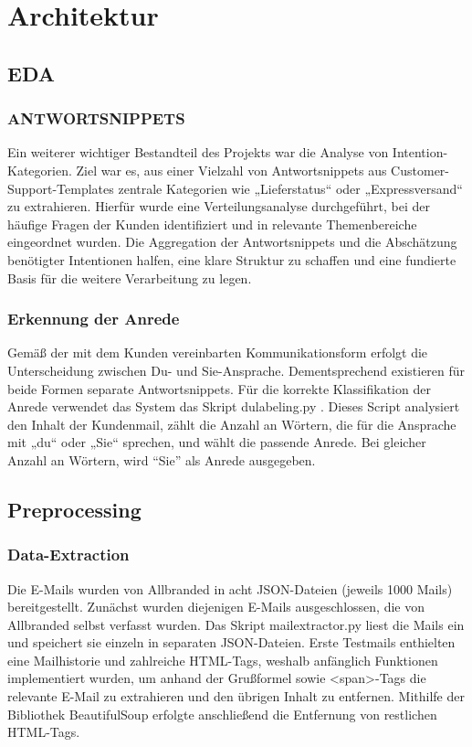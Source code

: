 \chapter{Architektur}


\section{EDA}

\subsection{ANTWORTSNIPPETS}

Ein weiterer wichtiger Bestandteil des Projekts war die Analyse von
Intention-Kategorien. Ziel war es, aus einer Vielzahl von Antwortsnippets
aus Customer-Support-Templates zentrale Kategorien wie „Lieferstatus“ oder
„Expressversand“ zu extrahieren. Hierfür wurde eine Verteilungsanalyse durchgeführt,
bei der häufige Fragen der Kunden identifiziert und in relevante Themenbereiche
eingeordnet wurden. Die Aggregation der Antwortsnippets und die Abschätzung
benötigter Intentionen halfen, eine klare Struktur zu schaffen und eine fundierte
Basis für die weitere Verarbeitung zu legen. 

\subsection{Erkennung der Anrede}

Gemäß der mit dem Kunden vereinbarten Kommunikationsform erfolgt die Unterscheidung
zwischen Du- und Sie-Ansprache. Dementsprechend existieren für beide Formen separate
Antwortsnippets. Für die korrekte Klassifikation der Anrede verwendet das System das
Skript du\textunderscore labeling.py . Dieses Script analysiert den Inhalt der Kundenmail,
zählt die Anzahl an Wörtern, die für die Ansprache mit „du“ oder „Sie“ sprechen, und wählt
die passende Anrede. Bei gleicher Anzahl an Wörtern, wird “Sie” als Anrede ausgegeben. 

\section{Preprocessing}

\subsection{Data-Extraction}

Die E-Mails wurden von Allbranded in acht JSON-Dateien (jeweils 1000 Mails) bereitgestellt.
Zunächst wurden diejenigen E-Mails ausgeschlossen, die von Allbranded selbst verfasst
wurden. Das Skript mail\textunderscore extractor.py liest die Mails ein und speichert sie einzeln in
separaten JSON-Dateien. Erste Testmails enthielten eine Mailhistorie und zahlreiche
HTML-Tags, weshalb anfänglich Funktionen implementiert wurden, um anhand der Grußformel
sowie <span>-Tags die relevante E-Mail zu extrahieren und den übrigen Inhalt zu entfernen.
Mithilfe der Bibliothek BeautifulSoup erfolgte anschließend die Entfernung von restlichen
HTML-Tags. 

